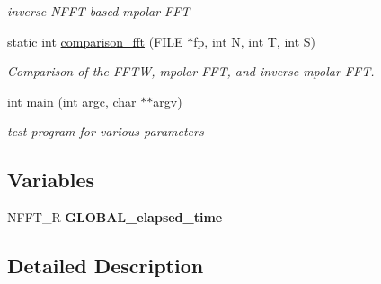 \begin{DoxyCompactItemize}
\begin{DoxyCompactList}\small\item\em inverse N\-F\-F\-T-\/based mpolar F\-F\-T \end{DoxyCompactList}\item 
\hypertarget{group__applications__polarFFT__mpolar_ga1cda6d7e21a940aad127799e88d88fbc}{static int \hyperlink{group__applications__polarFFT__mpolar_ga1cda6d7e21a940aad127799e88d88fbc}{comparison\-\_\-fft} (F\-I\-L\-E $\ast$fp, int N, int T, int S)}\label{group__applications__polarFFT__mpolar_ga1cda6d7e21a940aad127799e88d88fbc}

\begin{DoxyCompactList}\small\item\em Comparison of the F\-F\-T\-W, mpolar F\-F\-T, and inverse mpolar F\-F\-T. \end{DoxyCompactList}\item 
\hypertarget{group__applications__polarFFT__mpolar_ga3c04138a5bfe5d72780bb7e82a18e627}{int \hyperlink{group__applications__polarFFT__mpolar_ga3c04138a5bfe5d72780bb7e82a18e627}{main} (int argc, char $\ast$$\ast$argv)}\label{group__applications__polarFFT__mpolar_ga3c04138a5bfe5d72780bb7e82a18e627}

\begin{DoxyCompactList}\small\item\em test program for various parameters \end{DoxyCompactList}\end{DoxyCompactItemize}
\subsection*{Variables}
\begin{DoxyCompactItemize}
\item 
\hypertarget{group__applications__polarFFT__mpolar_ga520902714d280fb0838f87d81cb5099b}{N\-F\-F\-T\-\_\-\-R {\bfseries G\-L\-O\-B\-A\-L\-\_\-elapsed\-\_\-time}}\label{group__applications__polarFFT__mpolar_ga520902714d280fb0838f87d81cb5099b}

\end{DoxyCompactItemize}


\subsection{Detailed Description}


